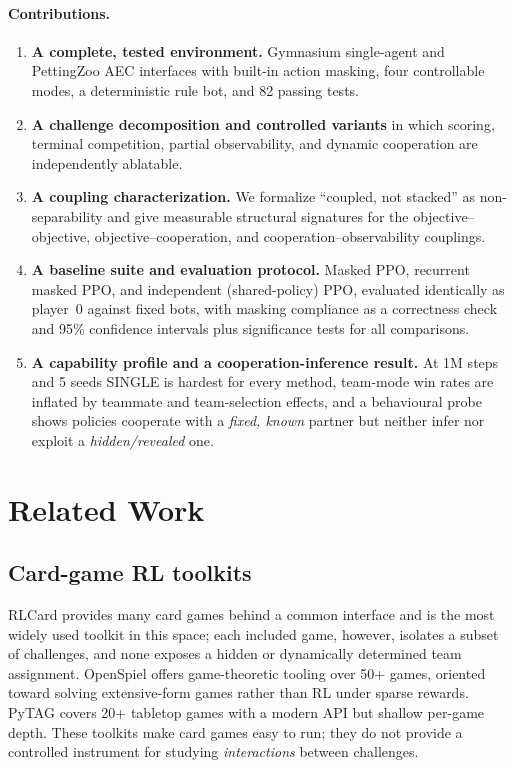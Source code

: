 \documentclass{article}
\begin{document}
\paragraph{Contributions.}
\begin{enumerate}
\item \textbf{A complete, tested environment.} Gymnasium single-agent and
PettingZoo AEC interfaces with built-in action masking, four controllable modes,
a deterministic rule bot, and 82 passing tests.
\item \textbf{A challenge decomposition and controlled variants} in which
scoring, terminal competition, partial observability, and dynamic cooperation
are independently ablatable.
\item \textbf{A coupling characterization.} We formalize ``coupled, not
stacked'' as non-separability and give measurable structural signatures for the
objective--objective, objective--cooperation, and cooperation--observability
couplings.
\item \textbf{A baseline suite and evaluation protocol.} Masked PPO, recurrent
masked PPO, and independent (shared-policy) PPO, evaluated identically as
player~0 against fixed bots, with masking compliance as a correctness check and
95\% confidence intervals plus significance tests for all comparisons.
\item \textbf{A capability profile and a cooperation-inference result.} At 1M
steps and 5 seeds SINGLE is hardest for every method, team-mode win rates are
inflated by teammate and team-selection effects, and a behavioural probe shows
policies cooperate with a \emph{fixed, known} partner but neither infer nor
exploit a \emph{hidden/revealed} one.
\end{enumerate}

\section{Related Work}
\subsection{Card-game RL toolkits}
RLCard \citep{rlcard} provides many card games behind a common interface and is
the most widely used toolkit in this space; each included game, however,
isolates a subset of challenges, and none exposes a hidden or dynamically
determined team assignment. OpenSpiel \citep{openspiel} offers game-theoretic
tooling over 50+ games, oriented toward solving extensive-form games rather than
RL under sparse rewards. PyTAG \citep{pytag} covers 20+ tabletop games with a
modern API but shallow per-game depth. These toolkits make card games easy to
run; they do not provide a controlled instrument for studying \emph{interactions}
between challenges.
\end{document}
